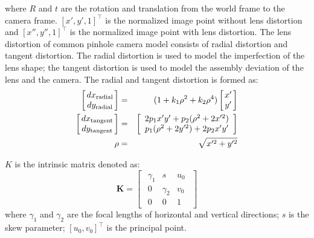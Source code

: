 \documentclass{report}
\begin{document}
where $R$ and $t$ are the rotation and translation from the world frame to the camera frame. $[x', y', 1]^\top$ is the normalized image point without lens distortion and $[x'', y'', 1]^\top$ is the normalized image point with lens distortion. The lens distortion of common pinhole camera model consists of radial distortion and tangent distortion. The radial distortion is used to model the imperfection of the lens shape; the tangent distortion is used to model the assembly deviation of the lens and the camera. The radial and tangent distortion is formed as: 
\begin{eqnarray}
\arraycolsep=1.5pt%
\begin{bmatrix}
	\begin{array}{c}
	dx_{\text{radial}} \\ dy_{\text{radial}}
	\end{array}
\end{bmatrix} 
&=&
(1 + k_1 \rho^2 + k_2 \rho^4) 
\arraycolsep=1.5pt%
\begin{bmatrix}
	\begin{array}{c}
	x' \\ y'
	\end{array}
\end{bmatrix} \\
\arraycolsep=1.5pt%
\begin{bmatrix}
	\begin{array}{c}
	dx_{\text{tangent}} \\ dy_{\text{tangent}}
	\end{array}
\end{bmatrix} 
&=&
\begin{bmatrix}
	\begin{array}{c}
	2 p_1 x' y' + p_2 (\rho^2 + 2 x'^2) \\ 
	p_1 (\rho^2 + 2 y'^2) + 2 p_2 x' y'
	\end{array}
\end{bmatrix} \\
\rho &=& \sqrt{x'^2 + y'^2}
\end{eqnarray}

$K$ is the intrinsic matrix denoted as: 
\begin{equation}
\mathbf{K} = 
\begin{bmatrix}
	\begin{array}{ccc}
	\gamma_1 & s & u_0 \\ 
	0 & \gamma_2 & v_0 \\ 	
	0 & 0 & 1
	\end{array}
\end{bmatrix}
\label{kEqn}
\end{equation}
where $\gamma_1$ and $\gamma_2$ are the focal lengths of horizontal and vertical directions; $s$ is the skew parameter; $[u_0, v_0]^\top$ is the principal point. 
\end{document}

